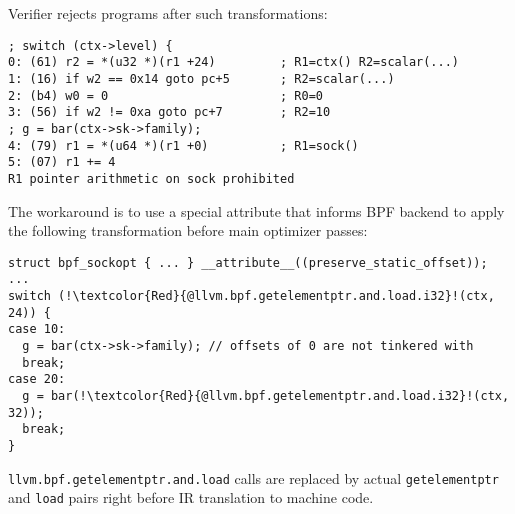 \documentclass{beamer}
\newcommand{\code}[1]{\texttt{#1}}
\begin{document}
\begin{frame}
  Verifier rejects programs after such transformations:

  \begin{verbatim}
; switch (ctx->level) {
0: (61) r2 = *(u32 *)(r1 +24)         ; R1=ctx() R2=scalar(...)
1: (16) if w2 == 0x14 goto pc+5       ; R2=scalar(...)
2: (b4) w0 = 0                        ; R0=0
3: (56) if w2 != 0xa goto pc+7        ; R2=10
; g = bar(ctx->sk->family);
4: (79) r1 = *(u64 *)(r1 +0)          ; R1=sock()
5: (07) r1 += 4
R1 pointer arithmetic on sock prohibited
  \end{verbatim}

  \framebreak

  The workaround is to use a special attribute that informs BPF
  backend to apply the following transformation before main optimizer
  passes:

  \begin{verbatim}
struct bpf_sockopt { ... } __attribute__((preserve_static_offset));
...
switch (!\textcolor{Red}{@llvm.bpf.getelementptr.and.load.i32}!(ctx, 24)) {
case 10:
  g = bar(ctx->sk->family); // offsets of 0 are not tinkered with
  break;
case 20:
  g = bar(!\textcolor{Red}{@llvm.bpf.getelementptr.and.load.i32}!(ctx, 32));
  break;
}
  \end{verbatim}

  \code{llvm.bpf.getelementptr.and.load} calls are replaced by actual
  \code{getelementptr} and \code{load} pairs right before IR
  translation to machine code.

\end{frame}
\end{document}

